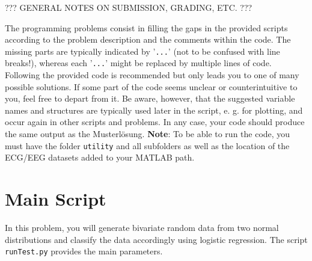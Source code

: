 \documentclass[10pt,a4paper,notitlepage]{report}
\begin{document}
??? GENERAL NOTES ON SUBMISSION, GRADING, ETC. ???

The programming problems consist in filling the gaps in the provided scripts according to the problem description and the comments within the code. The missing parts are typically indicated by '\texttt{...}' (not to be confused with line breaks!), whereas each '\texttt{...}' might be replaced by multiple lines of code. Following the provided code is recommended but only leads you to one of many possible solutions. If some part of the code seems unclear or counterintuitive to you, feel free to depart from it. Be aware, however, that the suggested variable names and structures are typically used later in the script, e. g. for plotting, and occur again in other scripts and problems. In any case, your code should produce the same output as the Musterlösung. \textbf{Note}: To be able to run the code, you must have the folder \texttt{utility} and all subfolders as well as the location of the ECG/EEG datasets added to your MATLAB path.

\section*{Main Script}
In this problem, you will generate bivariate random data from two normal distributions and classify the data accordingly using logistic regression. The script \texttt{runTest.py} provides the main parameters.
\end{document}
